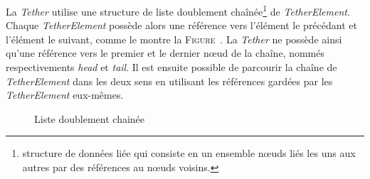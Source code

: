    La \textit{Tether} utilise une structure de liste doublement chaînée\footnote{structure de données liée qui consiste en un ensemble n\oe uds liés les uns aux autres par des références au n\oe uds voisins.} de \textit{TetherElement}. Chaque \textit{TetherElement} possède alors une référence vers l'élément le précédant et l'élément le suivant, comme le montre la \textsc{Figure}~\label{fig:goubly_linked_list}. La \textit{Tether} ne possède ainsi qu'une référence vers le premier et le dernier n\oe ud de la chaîne, nommés respectivements \textit{head} et \textit{tail}. Il est ensuite possible de parcourir la chaîne de \textit{TetherElement} dans les deux sens en utilisant les références gardées par les \textit{TetherElement} eux-mêmes. 

    \begin{figure}[!htb]
        \centering
        \caption{Liste doublement chainée}
        \label{fig:doubly_linked_list}
    \end{figure}

